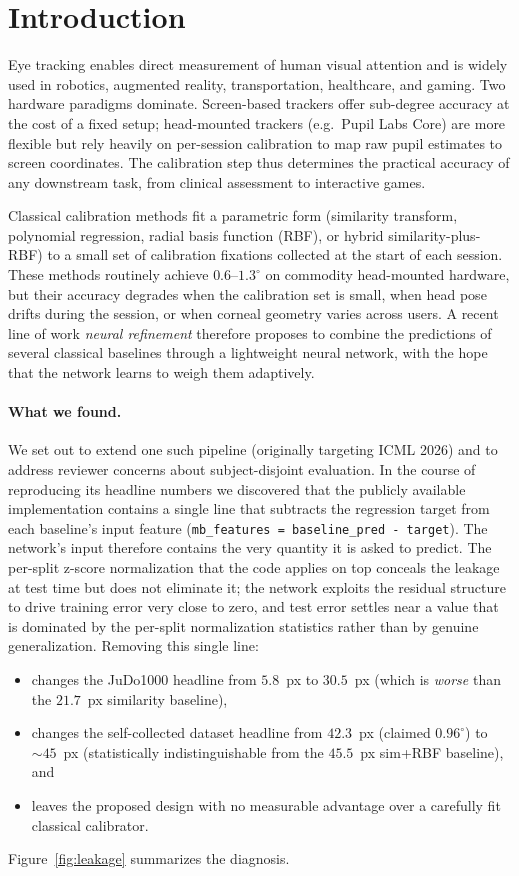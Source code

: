 \section{Introduction}
\label{sec:intro}

Eye tracking enables direct measurement of human visual attention and is
widely used in robotics, augmented reality, transportation, healthcare,
and gaming. Two hardware paradigms dominate. Screen-based trackers offer
sub-degree accuracy at the cost of a fixed setup; head-mounted trackers
(e.g.\ Pupil Labs Core) are more flexible but rely heavily on per-session
calibration to map raw pupil estimates to screen coordinates. The
calibration step thus determines the practical accuracy of any
downstream task, from clinical assessment to interactive games.

Classical calibration methods fit a parametric form (similarity transform,
polynomial regression, radial basis function (RBF), or hybrid
similarity-plus-RBF) to a small set of calibration fixations collected at
the start of each session. These methods routinely achieve $0.6$--$1.3^\circ$
on commodity head-mounted hardware, but their accuracy degrades when the
calibration set is small, when head pose drifts during the session, or
when corneal geometry varies across users. A recent line of work
\emph{neural refinement} therefore proposes to combine the predictions of
several classical baselines through a lightweight neural network, with
the hope that the network learns to weigh them adaptively.

\paragraph{What we found.}
We set out to extend one such pipeline (originally targeting ICML 2026)
and to address reviewer concerns about subject-disjoint evaluation. In
the course of reproducing its headline numbers we discovered that the
publicly available implementation contains a single line that subtracts
the regression target from each baseline's input feature
(\verb|mb_features = baseline_pred - target|). The network's input
therefore contains the very quantity it is asked to predict. The
per-split z-score normalization that the code applies on top conceals
the leakage at test time but does not eliminate it; the network exploits
the residual structure to drive training error very close to zero, and
test error settles near a value that is dominated by the per-split
normalization statistics rather than by genuine generalization. Removing
this single line:
\begin{itemize}
\item changes the JuDo1000 headline from $5.8$~px to $30.5$~px
  (which is \emph{worse} than the $21.7$~px similarity baseline),
\item changes the self-collected dataset headline from $42.3$~px (claimed
  $0.96^\circ$) to $\sim 45$~px (statistically indistinguishable from the
  $45.5$~px sim+RBF baseline), and
\item leaves the proposed design with no measurable advantage over a
  carefully fit classical calibrator.
\end{itemize}
Figure~\ref{fig:leakage} summarizes the diagnosis.

